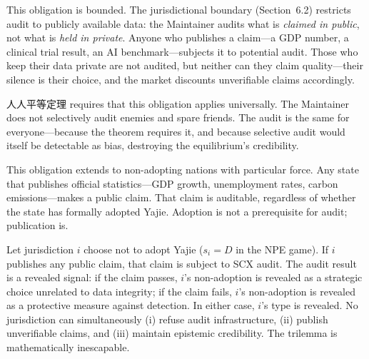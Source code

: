 \documentclass[12pt,a4paper]{ctexart}
\theoremstyle{definition}
\theoremstyle{remark}
\begin{document}
This obligation is bounded. The jurisdictional boundary (Section~6.2) restricts audit to publicly available data: the Maintainer audits what is \textit{claimed in public}, not what is \textit{held in private}. Anyone who publishes a claim—a GDP number, a clinical trial result, an AI benchmark—subjects it to potential audit. Those who keep their data private are not audited, but neither can they claim quality—their silence is their choice, and the market discounts unverifiable claims accordingly.

人人平等定理 requires that this obligation applies universally. The Maintainer does not selectively audit enemies and spare friends. The audit is the same for everyone—because the theorem requires it, and because selective audit would itself be detectable as bias, destroying the equilibrium's credibility.

This obligation extends to non-adopting nations with particular force. Any state that publishes official statistics—GDP growth, unemployment rates, carbon emissions—makes a public claim. That claim is auditable, regardless of whether the state has formally adopted Yajie. Adoption is not a prerequisite for audit; publication is.

\begin{corollary}
\label{cor:non-adopter-exposure}
Let jurisdiction $i$ choose not to adopt Yajie ($s_i = D$ in the NPE game). If $i$ publishes any public claim, that claim is subject to SCX audit. The audit result is a revealed signal: if the claim passes, $i$'s non-adoption is revealed as a strategic choice unrelated to data integrity; if the claim fails, $i$'s non-adoption is revealed as a protective measure against detection. In either case, $i$'s type is revealed. No jurisdiction can simultaneously (i) refuse audit infrastructure, (ii) publish unverifiable claims, and (iii) maintain epistemic credibility. The trilemma is mathematically inescapable.
\end{corollary}
\end{document}
